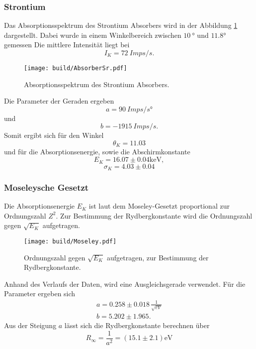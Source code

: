 \subsubsection{Strontium}
Das Absorptionsspektrum des Strontium Absorbers wird in der Abbildung \ref{fig:AbSr} dargestellt.
Dabei wurde in einem Winkelbereich zwischen $\qty{10}{°}$ und $\qty{11.8}°{}$ gemessen
Die mittlere Intensität liegt bei 
\begin{equation*}
    I_K = \qty{72}{Imps/s}.
\end{equation*}
\begin{figure}[H]
    \centering
    \texttt{[image: build/AbsorberSr.pdf]}    
    \caption{Absorptionsspektrum des Strontium Absorbers.}
    \label{fig:AbSr}
\end{figure}
Die Parameter der Geraden ergeben 
\begin{equation*}
    a = \qty{90}{Imps/s°}
\end{equation*}
und
\begin{equation*}
    b = \qty{-1915}{Imps/s}.
\end{equation*}
Somit ergibt sich für den Winkel
\begin{equation*}
    \theta_K = 11.03
\end{equation*}
und für die Absorptionsenergie, sowie die Abschirmkonstante
\begin{equation*}
   E_K = 16.07 \pm 0.04 \unit{\kilo\electronvolt}, 
\end{equation*}
\begin{equation*}
    \sigma_K = 4.03 \pm 0.04
\end{equation*}

\subsubsection{Moseleysche Gesetzt}
Die Absorptionsenergie $E_K$ ist laut dem Moseley-Gesetzt proportional zur Ordnungszahl $Z^2$.
Zur Bestimmung der Rydbergkonstante wird die Ordnungszahl gegen $\sqrt{E_K}$ aufgetragen.

\begin{figure}[H]
    \centering
    \texttt{[image: build/Moseley.pdf]}
    \caption{Ordnungszahl gegen $\sqrt{E_K}$ aufgetragen, zur Bestimmung der Rydbergkonstante.}
    \label{fig:Mos}
\end{figure}
\noindent Anhand des Verlaufs der Daten, wird eine Ausgleichsgerade verwendet.
Für die Parameter ergeben sich 
\begin{align*}
    a = 0.258 \pm 0.018 \, \frac{1}{\sqrt{eV}} \\
    b = 5.202 \pm 1.965.
\end{align*} 
Aus der Steigung $a$ lässt sich die Rydbergkonstante berechnen über
\begin{equation*}
    R_\infty = \frac{1}{a^2} = (15.1 \pm 2.1) \unit{\electronvolt}
\end{equation*}